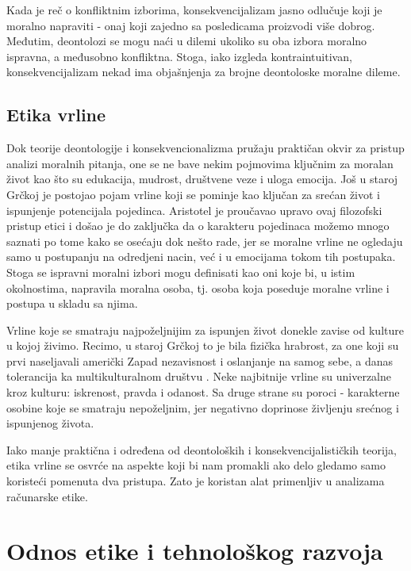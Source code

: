 \documentclass[a4paper]{article}
\begin{document}
Kada je reč o konfliktnim izborima, konsekvencijalizam jasno odlučuje koji je moralno napraviti - onaj koji zajedno sa posledicama proizvodi više dobrog. Međutim, deontolozi se mogu naći u dilemi ukoliko su oba izbora moralno ispravna, a međusobno konfliktna. Stoga, iako izgleda kontraintuitivan, konsekvencijalizam nekad ima objašnjenja za brojne deontoloske moralne dileme. 

\subsection{Etika vrline}

Dok teorije deontologije i konsekvencionalizma pružaju praktičan okvir za pristup analizi moralnih pitanja, one se ne bave nekim pojmovima ključnim za moralan život kao što su edukacija, mudrost, društvene veze i uloga emocija. 
Još u staroj Grčkoj je postojao pojam vrline koji se pominje kao ključan za srećan život i ispunjenje potencijala pojedinca.
Aristotel je proučavao upravo ovaj filozofski pristup etici i došao je do zaključka da o karakteru pojedinaca možemo mnogo saznati po tome kako se osećaju dok nešto rade, jer se moralne vrline ne ogledaju samo u postupanju na odredjeni nacin, već i u emocijama tokom tih postupaka.
Stoga se ispravni moralni izbori mogu definisati kao oni koje bi, u istim okolnostima, napravila moralna osoba, tj. osoba koja poseduje moralne vrline i postupa u skladu sa njima.

Vrline koje se smatraju najpoželjnijim za ispunjen život donekle zavise od kulture u kojoj živimo.
Recimo, u staroj Grčkoj to je bila fizička hrabrost, za one koji su prvi naseljavali američki Zapad nezavisnost i oslanjanje na samog sebe, a danas tolerancija ka multikulturalnom društvu \cite{quinn-ethics}.
Neke najbitnije vrline su univerzalne kroz kulturu: iskrenost, pravda i odanost.
Sa druge strane su poroci - karakterne osobine koje se smatraju nepoželjnim, jer negativno doprinose življenju srećnog i ispunjenog života. 

Iako manje praktična i određena od deontoloških i konsekvencijalističkih teorija, etika vrline se osvrće na aspekte koji bi nam promakli ako delo gledamo samo koristeći pomenuta dva pristupa. Zato je koristan alat primenljiv u analizama računarske etike. 

\section{Odnos etike i tehnološkog razvoja}
\end{document}
